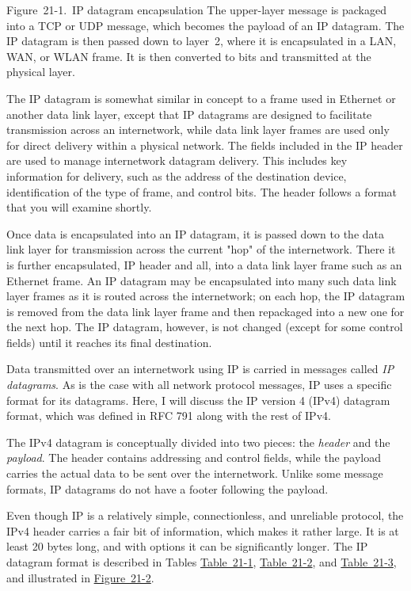 \documentclass[b5paper,11pt]{memoir}
\begin{document}
Figure~21-1.~IP datagram encapsulation The upper-layer message is
packaged into a TCP or UDP message, which becomes the payload of an IP
datagram. The IP datagram is then passed down to layer~2, where it is
encapsulated in a LAN, WAN, or WLAN frame. It is then converted to bits
and transmitted at the physical layer.

The IP datagram is somewhat similar in concept to a frame used in
Ethernet or another data link layer, except that IP datagrams are
designed to facilitate transmission across an internetwork, while data
link layer frames are used only for direct delivery within a physical
network. The fields included in the IP header are used to manage
internetwork datagram delivery. This includes key information for
delivery, such as the address of the destination device, identification
of the type of frame, and control bits. The header follows a format that
you will examine shortly.

Once data is encapsulated into an IP datagram, it is passed down to the
data link layer for transmission across the current "hop" of the
internetwork. There it is further encapsulated, IP header and all, into
a data link layer frame such as an Ethernet frame. An IP datagram may be
encapsulated into many such data link layer frames as it is routed
across the internetwork; on each hop, the IP datagram is removed from
the data link layer frame and then repackaged into a new one for the
next hop. The IP datagram, however, is not changed (except for some
control fields) until it reaches its final destination.

\protect\hypertarget{ch21s02.html}{}{}

Data transmitted over an internetwork using IP is carried in messages
called {\emph{IP datagrams}}. As is the case with all network protocol
messages, IP uses a specific
\protect\hypertarget{ch21s02.htmlux5cux23idx-CHP-21-0776}{}{}format for
its datagrams. Here, I will discuss the IP version 4 (IPv4) datagram
\protect\hypertarget{ch21s02.htmlux5cux23idx-CHP-21-0777}{}{}format,
which was defined in RFC 791 along with the rest of IPv4.

The IPv4 datagram is conceptually divided into two pieces: the
{\emph{header}} and the {\emph{payload}}. The header contains addressing
and control fields, while the payload carries the actual data to be sent
over the internetwork. Unlike some message formats, IP datagrams do not
have a footer following the payload.

Even though IP is a relatively simple, connectionless, and unreliable
protocol, the IPv4 header carries a fair bit of information, which makes
it rather large. It is at least 20 bytes long, and with options it can
be significantly longer. The IP datagram format is described in Tables
\protect\hyperlink{ch21s02.htmlux5cux23internet_protocol_version__ipv_datagram}{Table~21-1},
\protect\hyperlink{ch21s02.htmlux5cux23ipv_flags_subfields}{Table~21-2},
and
\protect\hyperlink{ch21s02.htmlux5cux23ipv_protocol_subfields}{Table~21-3},
and illustrated in
\protect\hyperlink{ch21s02.htmlux5cux23ipv4_datagram_format_this_diagram_shows_}{Figure~21-2}.
\end{document}

